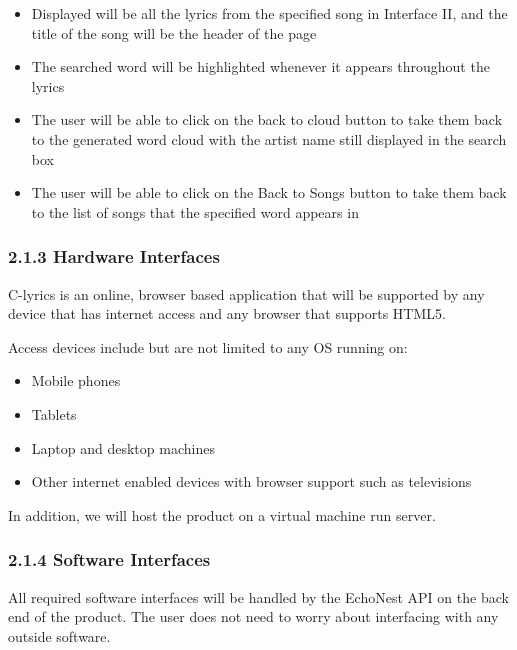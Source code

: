 \documentclass[]{article}
\begin{document}
\begin{itemize}
\begin{itemize}
    \begin{itemize}
    \itemsep1pt\parskip0pt
    \item
      Displayed will be all the lyrics from the specified song in
      Interface II, and the title of the song will be the header of the
      page
    \item
      The searched word will be highlighted whenever it appears
      throughout the lyrics
    \item
      The user will be able to click on the back to cloud button to take
      them back to the generated word cloud with the artist name still
      displayed in the search box
    \item
      The user will be able to click on the Back to Songs button to take
      them back to the list of songs that the specified word appears in
    \end{itemize}
  \end{itemize}
\end{itemize}

\subsubsection{2.1.3 Hardware Interfaces}\label{hardware-interfaces}

C-lyrics is an online, browser based application that will be supported
by any device that has internet access and any browser that supports
HTML5.

Access devices include but are not limited to any OS running on:

\begin{itemize}
\itemsep1pt\parskip0pt
\item
  Mobile phones
\item
  Tablets
\item
  Laptop and desktop machines
\item
  Other internet enabled devices with browser support such as
  televisions
\end{itemize}

In addition, we will host the product on a virtual machine run server.

\subsubsection{2.1.4 Software Interfaces}\label{software-interfaces}

All required software interfaces will be handled by the EchoNest API on
the back end of the product. The user does not need to worry about
interfacing with any outside software.
\end{document}
